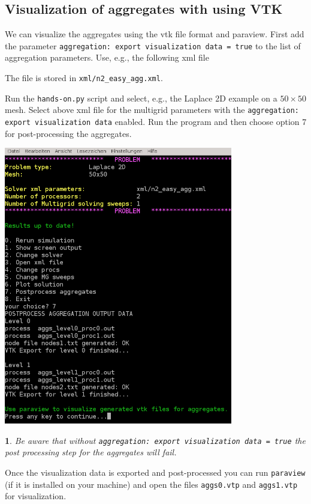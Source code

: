 \documentclass[10pt,fleqn]{book}
\newtheorem*{mycomment}{\ding{42}}
\begin{document}
\subsection{Visualization of aggregates with \muelu using VTK}
We can visualize the aggregates using the vtk file format and paraview. First add the parameter \texttt{aggregation: export visualization data = true} to the list of aggregation parameters. Use, e.g., the following xml file

The file is stored in \texttt{xml/n2\_easy\_agg.xml}.

Run the \texttt{hands-on.py} script and select, e.g., the Laplace 2D example on a $50\times 50$ mesh. Select above xml file for the multigrid parameters with the \texttt{aggregation: export visualization data} enabled. Run the program and then choose option 7 for post-processing the aggregates.
\begin{center}\includegraphics[width=10cm]{pics/tut1_14.png} \end{center}
\begin{mycomment}
Be aware that without \texttt{aggregation: export visualization data = true} the post processing step for the aggregates will fail.
\end{mycomment}

Once the visualization data is exported and post-processed you can run \texttt{paraview} (if it is installed on your machine) and open the files \texttt{aggs0.vtp} and \texttt{aggs1.vtp} for visualization.
\end{document}
